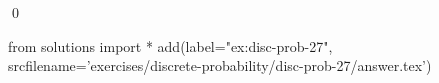
\begin{ex} 
  \label{ex:disc-prob-27}
  
  \qed
\end{ex} 
\begin{python0}
from solutions import *
add(label="ex:disc-prob-27",
    srcfilename='exercises/discrete-probability/disc-prob-27/answer.tex') 
\end{python0}
